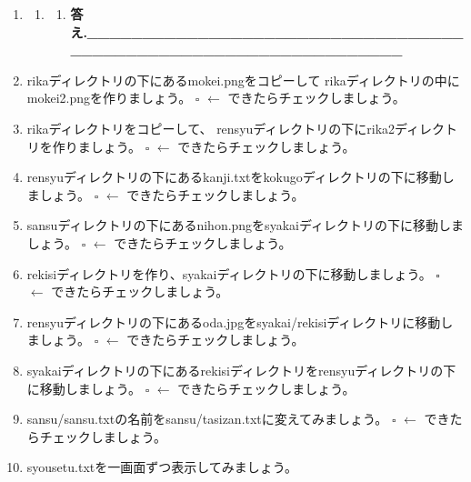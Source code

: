 \documentclass[a4paper,dvipdfmx]{jarticle}
\newcounter{saveenum}
\begin{document}
\setcounter{saveenum}{\value{enumi}}
\begin{enumerate}
\setcounter{enumi}{\value{saveenum}}
\item[] 
\bigskip

\setcounter{saveenum}{\value{enumii}}
\begin{enumerate}
\setcounter{enumii}{\value{saveenum}}
\item \setcounter{saveenum}{\value{enumiii}}
\begin{enumerate}
\setcounter{enumiii}{\value{saveenum}}
\item[] {\ttfamily\bfseries
答え.\_\_\_\_\_\_\_\_\_\_\_\_\_\_\_\_\_\_\_\_\_\_\_\_\_\_\_\_\_\_\_\_\_\_\_\_\_\_\_\_\_\_\_\_\_\_\_\_\_\_\_\_\_\_\_\_\_\_\_\_\_\_\_\_}
\end{enumerate}
\end{enumerate}

\bigskip
\item
rikaディレクトリの下にあるmokei.pngをコピーして\newline
rikaディレクトリの中にmokei2.pngを作りましょう。\newline
${\square}$ $\leftarrow $
できたらチェックしましょう。
\item rikaディレクトリをコピーして、\newline
rensyuディレクトリの下にrika2ディレクトリを作りましょう。\newline
${\square}$ $\leftarrow $
できたらチェックしましょう。
\item
rensyuディレクトリの下にあるkanji.txtをkokugoディレクトリの下に移動しましょう。\newline
${\square}$ $\leftarrow $
できたらチェックしましょう。
\item
sansuディレクトリの下にあるnihon.pngをsyakaiディレクトリの下に移動しましょう。\newline
${\square}$ $\leftarrow $
できたらチェックしましょう。
\item
rekisiディレクトリを作り、syakaiディレクトリの下に移動しましょう。\newline
${\square}$ $\leftarrow $
できたらチェックしましょう。
\item
rensyuディレクトリの下にあるoda.jpgをsyakai/rekisiディレクトリに移動しましょう。\newline
${\square}$ $\leftarrow $
できたらチェックしましょう。
\item \clearpage
syakaiディレクトリの下にあるrekisiディレクトリをrensyuディレクトリの下に移動しましょう。\newline
${\square}$ $\leftarrow $
できたらチェックしましょう。
\item
sansu/sansu.txtの名前をsansu/tasizan.txtに変えてみましょう。\newline
${\square}$ $\leftarrow $
できたらチェックしましょう。
\item
syousetu.txtを一画面ずつ表示してみましょう。


\end{enumerate}
\end{document}

